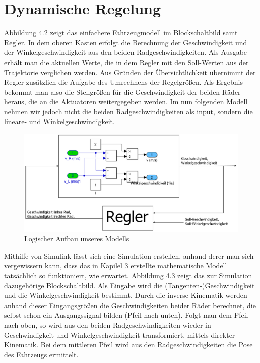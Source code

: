 \section{Dynamische Regelung}
Abbildung 4.2 zeigt das einfachere Fahrzeugmodell im Blockschaltbild samt Regler. In dem oberen Kasten erfolgt die Berechnung der Geschwindigkeit und der Winkelgeschwindigkeit aus den beiden Radgeschwindigkeiten. Als Ausgabe erhält man die aktuellen Werte, die in dem Regler mit den Soll-Werten aus der Trajektorie verglichen werden. Aus Gründen der Übersichtlichkeit übernimmt der Regler zusätzlich die Aufgabe des Umrechnens der Regelgrößen. Als Ergebnis bekommt man also die Stellgrößen für die Geschwindigkeit der beiden Räder heraus, die an die Aktuatoren weitergegeben werden. Im nun folgenden Modell nehmen wir jedoch nicht die beiden Radgeschwindigkeiten als input, sondern die lineare- und Winkelgeschwindigkeit. \\
\begin{figure}[htb]
  \centering  
  \includegraphics[scale=1]{img/Blockschaltbild1.png}
  \caption{Logischer Aufbau unseres Modells}
  \label{fig:starwars}
\end{figure}
Mithilfe von Simulink lässt sich eine Simulation erstellen, anhand derer man sich vergewissern kann, dass das in Kapilel 3 erstellte mathematische Modell tatsächlich so funktioniert, wie erwartet. Abbildung 4.3 zeigt das zur Simulation dazugehörige Blockschaltbild. Als Eingabe wird die (Tangenten-)Geschwindigkeit und die Winkelgeschwindigkeit bestimmt. Durch die inverse Kinematik werden anhand dieser Eingangsgrößen die Geschwindigkeiten beider Räder berechnet, die selbst schon ein Ausgangssignal bilden (Pfeil nach unten). Folgt man dem Pfeil nach oben, so wird aus den beiden Radgeschwindigkeiten wieder in Geschwindigkeit und Winkelgeschwindigkeit transformiert, mittels direkter Kinematik. Bei dem mittleren Pfeil wird aus den Radgeschwindigkeiten die Pose des Fahrzeugs ermittelt. \\
